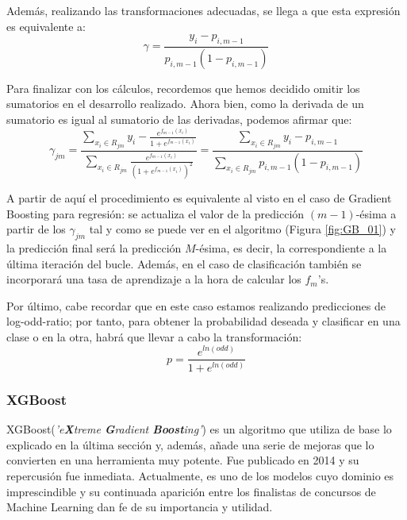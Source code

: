 \documentclass[12pt,twoside]{article}
\begin{document}
Además, realizando las transformaciones adecuadas, se llega a que esta expresión es equivalente a:
\begin{equation}
\label{eqn:4}
\gamma = \frac{y_i - p_{i, m-1}}{p_{i, m-1}(1 - p_{i, m-1})}
\end{equation}

Para finalizar con los cálculos, recordemos que hemos decidido omitir los sumatorios en el desarrollo realizado. Ahora bien, como la derivada de un sumatorio es igual al sumatorio de las derivadas, podemos afirmar que:
\begin{equation*}
\gamma_{jm} = \frac{\displaystyle \sum_{x_i \in R_{jm}} y_i - \frac{e^{f_{m-1}(x_i)}}{1 + e^{f_{m-1}(x_i)}}}{\displaystyle \sum_{x_i \in R_{jm}} \frac{e^{f_{m-1}(x_i)}}{(1 + e^{f_{m-1}(x_i)})^2}} = \frac{\displaystyle \sum_{x_i \in R_{jm}} y_i - p_{i, m-1}}{\displaystyle \sum_{x_i \in R_{jm}} p_{i, m-1}(1 - p_{i, m-1})}
\end{equation*}

A partir de aquí el procedimiento es equivalente al visto en el caso de Gradient Boosting para regresión: se actualiza el valor de la predicción $(m-1)$-ésima a partir de los $\gamma_{jm}$ tal y como se puede ver en el algoritmo (Figura \ref{fig:GB_01}) y la predicción final será la predicción $M$-ésima, es decir, la correspondiente a la última iteración del bucle. Además, en el caso de clasificación también se incorporará una tasa de aprendizaje a la hora de calcular los $f_m$'s.

Por último, cabe recordar que en este caso estamos realizando predicciones de log-odd-ratio; por tanto, para obtener la probabilidad deseada y clasificar en una clase o en la otra, habrá que llevar a cabo la transformación:
\begin{equation*}
p = \frac{e^{ln(odd)}}{1 + e^{ln(odd)}}
\end{equation*}





\subsubsection{XGBoost} \label{sec:XGBoost}
XGBoost(\textit{'e\textbf{X}treme \textbf{G}radient \textbf{Boost}ing'}) es un algoritmo que utiliza de base lo explicado en la última sección y, además, añade una serie de mejoras que lo convierten en una herramienta muy potente. Fue publicado en 2014 \cite{CH01} y su repercusión fue inmediata. Actualmente, es uno de los modelos cuyo dominio es imprescindible y su continuada aparición entre los finalistas de concursos de Machine Learning dan fe de su importancia y utilidad.
\end{document}
